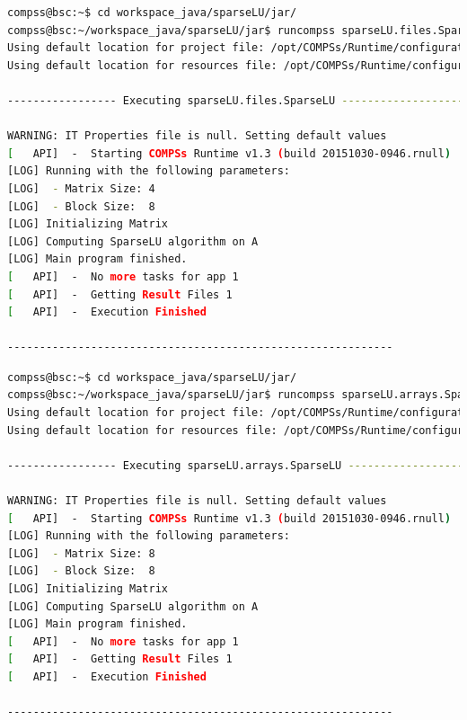 \begin{lstlisting}[language=bash]
compss@bsc:~$ cd workspace_java/sparseLU/jar/
compss@bsc:~/workspace_java/sparseLU/jar$ runcompss sparseLU.files.SparseLU 4 8
Using default location for project file: /opt/COMPSs/Runtime/configuration/xml/projects/project.xml
Using default location for resources file: /opt/COMPSs/Runtime/configuration/xml/resources/resources.xml

----------------- Executing sparseLU.files.SparseLU --------------------------

WARNING: IT Properties file is null. Setting default values
[   API]  -  Starting COMPSs Runtime v1.3 (build 20151030-0946.rnull)
[LOG] Running with the following parameters:
[LOG]  - Matrix Size: 4
[LOG]  - Block Size:  8
[LOG] Initializing Matrix
[LOG] Computing SparseLU algorithm on A
[LOG] Main program finished.
[   API]  -  No more tasks for app 1
[   API]  -  Getting Result Files 1
[   API]  -  Execution Finished

------------------------------------------------------------
\end{lstlisting}

\begin{lstlisting}[language=bash]
compss@bsc:~$ cd workspace_java/sparseLU/jar/
compss@bsc:~/workspace_java/sparseLU/jar$ runcompss sparseLU.arrays.SparseLU 8 8
Using default location for project file: /opt/COMPSs/Runtime/configuration/xml/projects/project.xml
Using default location for resources file: /opt/COMPSs/Runtime/configuration/xml/resources/resources.xml

----------------- Executing sparseLU.arrays.SparseLU --------------------------

WARNING: IT Properties file is null. Setting default values
[   API]  -  Starting COMPSs Runtime v1.3 (build 20151030-0946.rnull)
[LOG] Running with the following parameters:
[LOG]  - Matrix Size: 8
[LOG]  - Block Size:  8
[LOG] Initializing Matrix
[LOG] Computing SparseLU algorithm on A
[LOG] Main program finished.
[   API]  -  No more tasks for app 1
[   API]  -  Getting Result Files 1
[   API]  -  Execution Finished

------------------------------------------------------------
\end{lstlisting}





